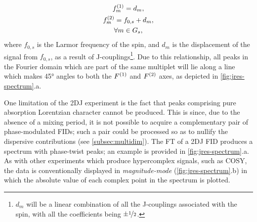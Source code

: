 \begin{subequations}
    \begin{gather}
        f_m^{(1)} = d_m,\\
        f_m^{(2)} = f_{0,s} + d_m,\\
        \forall m \in G_s\notag,
    \end{gather}%
    \label{eq:f1-f2-2dj}%
\end{subequations}
where $f_{0,s}$ is the Larmor frequency of
the spin, and $d_m$ is the displacement
of the signal from $f_{0,s}$, as a result of J-couplings\footnote{
    $d_m$ will be a linear combination of all the J-couplings
    associated with the spin, with all the coefficients being $\pm
    \nicefrac{1}{2}$.
}. Due to this relationship, all peaks in the Fourier domain which are part of
the same multiplet will lie along a line which makes \ang{45} angles to both
the $F^{(1)}$ and $F^{(2)}$ axes, as depicted in \cref{fig:jres-spectrum}.a.

One limitation of the \ac{2DJ} experiment is the fact that peaks comprising
pure absorption Lorentzian character cannot be produced. This is since, due
to the absence of a mixing period, it is not possible to acquire a
complementary pair of phase-modulated \acp{FID}; such a pair could be processed
so as to nullify the dispersive contributions (see \cref{subsec:multidim}).
The FT of a \ac{2DJ} \ac{FID} produces a spectrum with phase-twist
peaks; an example is provided in \cref{fig:jres-spectrum}.a. As with
other experiments which produce hypercomplex signals, such as \ac{COSY}, the
data is conventionally displayed in \emph{magnitude-mode}
(\cref{fig:jres-spectrum}.b) in which the absolute value of each complex point
in the spectrum is plotted.

